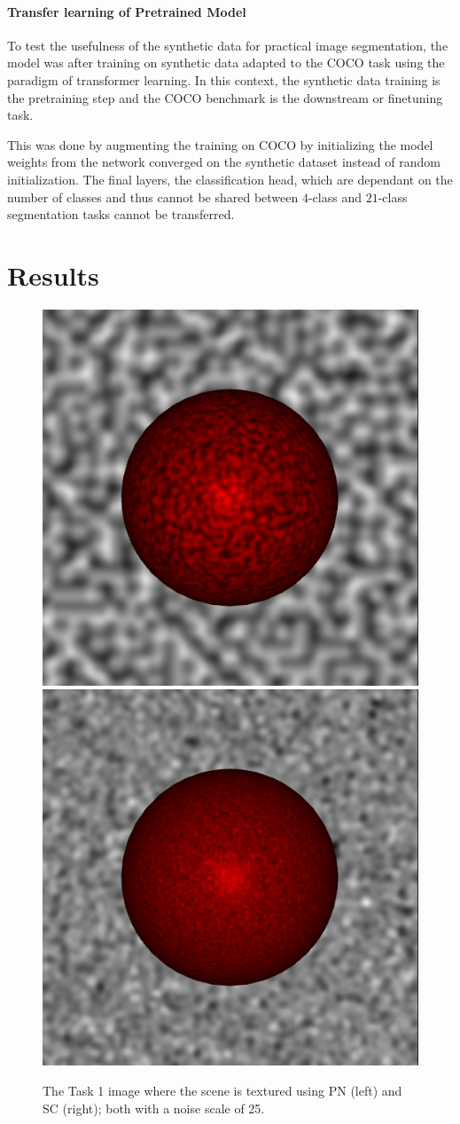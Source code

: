\documentclass[12pt,fleqn]{article}
\begin{document}
\paragraph{Transfer learning of Pretrained Model}
To test the usefulness of the synthetic data for practical image segmentation, the model was after training on synthetic data adapted to the COCO task using the paradigm of transformer learning.
In this context, the synthetic data training is the pretraining step and the COCO benchmark is the downstream or finetuning task.

This was done by augmenting the training on COCO by initializing the model weights from the network converged on the synthetic dataset instead of random initialization.
The final layers, the classification head, which are dependant on the number of classes and thus cannot be shared between $4$-class and $21$-class segmentation tasks cannot be transferred.

\section{Results}%
\label{sec:results}
\begin{figure}[H]
    \centering
        \includegraphics[width=.48\linewidth]{t1-perlin}
        \includegraphics[width=.48\linewidth]{t1-sc}
    \caption{
        The Task 1 image where the scene is textured using PN (left) and SC (right); both with a noise scale of 25.
    }
    \label{fig:t1}
\end{figure}\noindent
\end{document}
